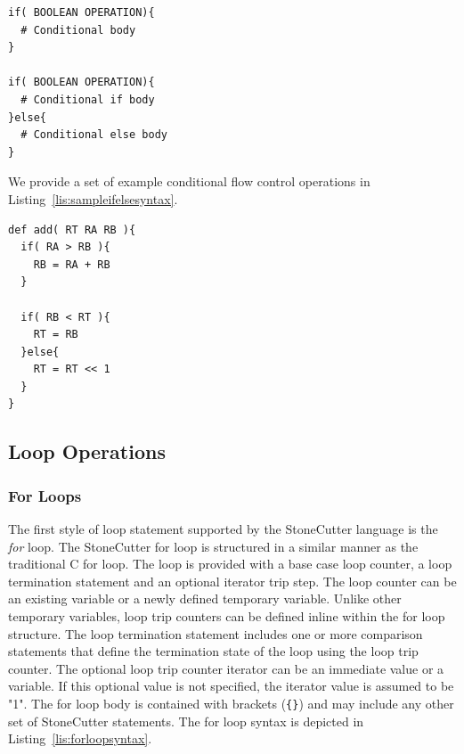 \documentclass{article}
\begin{document}
\vspace{0.125in}
\begin{lstlisting}[frame=single,style=base,caption={Flow Control Syntax},captionpos=b,label={lis:ifelsesyntax}]
if( BOOLEAN OPERATION){
  # Conditional body
}

if( BOOLEAN OPERATION){
  # Conditional if body
}else{
  # Conditional else body
}
\end{lstlisting}

We provide a set of example conditional flow control operations in Listing~\ref{lis:sampleifelsesyntax}.  

\vspace{0.125in}
\begin{lstlisting}[frame=single,style=base,caption={Sample If-Else Syntax},captionpos=b,label={lis:sampleifelsesyntax}]
def add( RT RA RB ){
  if( RA > RB ){
    RB = RA + RB
  }
  
  if( RB < RT ){
    RT = RB
  }else{
    RT = RT << 1
  }
}
\end{lstlisting}

\clearpage
\subsection{Loop Operations}
\label{sec:LoopOperations}

\subsubsection{For Loops}
\label{sec:ForLoops}

The first style of loop statement supported by the StoneCutter language is the 
\textit{for} loop.  The StoneCutter for loop is structured in a similar manner as the 
traditional C for loop.  The loop is provided with a base case loop counter, a loop 
termination statement and an optional iterator trip step.  The loop counter 
can be an existing variable or a newly defined temporary variable.  Unlike other 
temporary variables, loop trip counters can be defined inline within the for loop 
structure.  The loop termination statement includes one or more comparison 
statements that define the termination state of the loop using the loop trip 
counter.  The optional loop trip counter iterator can be an immediate value or a variable.  
If this optional value is not specified, the iterator value is assumed to be "1".  The for loop body 
is contained with brackets (\texttt{\{\}}) and may include any other set of StoneCutter statements.  The for loop 
syntax is depicted in Listing~\ref{lis:forloopsyntax}.     
\end{document}
